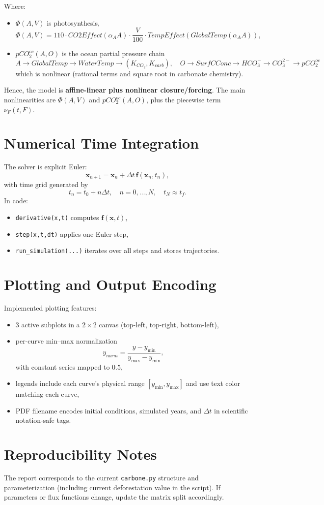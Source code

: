 \documentclass[11pt,a4paper]{article}
\begin{document}
Where:
\begin{itemize}
    \item $\Phi(A,V)$ is photosynthesis,
    \[
    \Phi(A,V)=110\cdot CO2Effect(\alpha_A A)\cdot\frac{V}{100}\cdot TempEffect\!\left(GlobalTemp(\alpha_A A)\right),
    \]
    \item $pCO_2^{oc}(A,O)$ is the ocean partial pressure chain
    \[
    A\to GlobalTemp\to WaterTemp\to (K_{CO_2},K_{carb}),\quad O\to SurfCConc\to HCO_3^-\to CO_3^{2-}\to pCO_2^{oc}
    \]
    which is nonlinear (rational terms and square root in carbonate chemistry).
\end{itemize}

Hence, the model is \textbf{affine-linear plus nonlinear closure/forcing}. The main nonlinearities are $\Phi(A,V)$ and $pCO_2^{oc}(A,O)$, plus the piecewise term $\nu_F(t,F)$.

\section{Numerical Time Integration}
The solver is explicit Euler:
\[
\bm{x}_{n+1}=\bm{x}_n+\Delta t\,\bm{f}(\bm{x}_n,t_n),
\]
with time grid generated by
\[
t_n=t_0+n\Delta t,\quad n=0,\dots,N,\quad t_N\approx t_f.
\]
In code:
\begin{itemize}
    \item \texttt{derivative(x,t)} computes $\bm{f}(\bm{x},t)$,
    \item \texttt{step(x,t,dt)} applies one Euler step,
    \item \texttt{run\_simulation(...)} iterates over all steps and stores trajectories.
\end{itemize}

\section{Plotting and Output Encoding}
Implemented plotting features:
\begin{itemize}
    \item 3 active subplots in a 2\,$\times$\,2 canvas (top-left, top-right, bottom-left),
    \item per-curve min--max normalization
    \[
    y_{norm}=\frac{y-y_{\min}}{y_{\max}-y_{\min}},
    \]
    with constant series mapped to $0.5$,
    \item legends include each curve's physical range $[y_{\min},y_{\max}]$ and use text color matching each curve,
    \item PDF filename encodes initial conditions, simulated years, and $\Delta t$ in scientific notation-safe tags.
\end{itemize}

\section{Reproducibility Notes}
The report corresponds to the current \texttt{carbone.py} structure and parameterization (including current deforestation value in the script). If parameters or flux functions change, update the matrix split accordingly.
\end{document}
